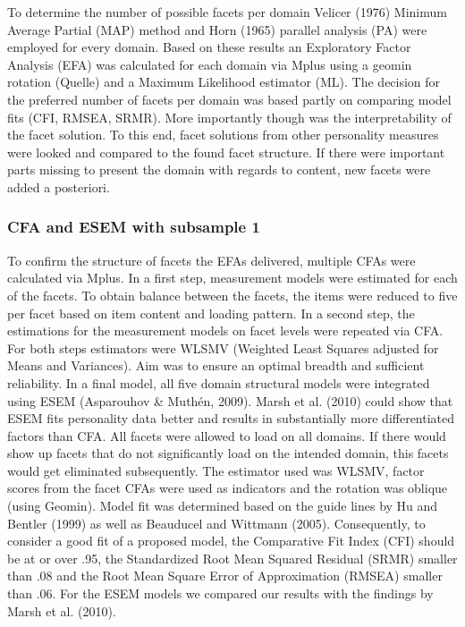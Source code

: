 \documentclass[,man,floatsintext]{apa6}
\begin{document}
To determine the number of possible facets per domain Velicer (1976)
Minimum Average Partial (MAP) method and Horn (1965) parallel analysis
(PA) were employed for every domain. Based on these results an
Exploratory Factor Analysis (EFA) was calculated for each domain via
Mplus using a geomin rotation (Quelle) and a Maximum Likelihood
estimator (ML). The decision for the preferred number of facets per
domain was based partly on comparing model fits (CFI, RMSEA, SRMR). More
importantly though was the interpretability of the facet solution. To
this end, facet solutions from other personality measures were looked
and compared to the found facet structure. If there were important parts
missing to present the domain with regards to content, new facets were
added a posteriori.

\subsubsection{CFA and ESEM with subsample
1}\label{cfa-and-esem-with-subsample-1}

To confirm the structure of facets the EFAs delivered, multiple CFAs
were calculated via Mplus. In a first step, measurement models were
estimated for each of the facets. To obtain balance between the facets,
the items were reduced to five per facet based on item content and
loading pattern. In a second step, the estimations for the measurement
models on facet levels were repeated via CFA. For both steps estimators
were WLSMV (Weighted Least Squares adjusted for Means and Variances).
Aim was to ensure an optimal breadth and sufficient reliability. In a
final model, all five domain structural models were integrated using
ESEM (Asparouhov \& Muthén, 2009). Marsh et al. (2010) could show that
ESEM fits personality data better and results in substantially more
differentiated factors than CFA. All facets were allowed to load on all
domains. If there would show up facets that do not significantly load on
the intended domain, this facets would get eliminated subsequently. The
estimator used was WLSMV, factor scores from the facet CFAs were used as
indicators and the rotation was oblique (using Geomin). Model fit was
determined based on the guide lines by Hu and Bentler (1999) as well as
Beauducel and Wittmann (2005). Consequently, to consider a good fit of a
proposed model, the Comparative Fit Index (CFI) should be at or over
.95, the Standardized Root Mean Squared Residual (SRMR) smaller than .08
and the Root Mean Square Error of Approximation (RMSEA) smaller than
.06. For the ESEM models we compared our results with the findings by
Marsh et al. (2010).
\end{document}
